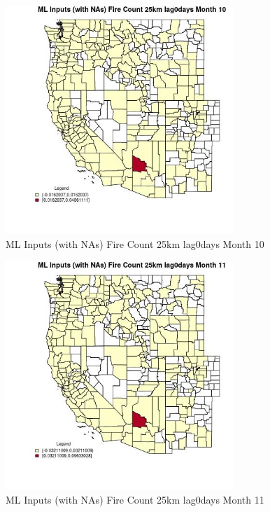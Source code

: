 \begin{figure} 
\centering  
\includegraphics[width=0.77\textwidth]{Code_Outputs/Report_ML_input_PM25_Step4_part_e_de_duplicated_aves_compiled_2019-05-21wNAs_CountyFire_Count_25km_lag0daysmedianMonth10.jpg} 
\caption{\label{fig:Report_ML_input_PM25_Step4_part_e_de_duplicated_aves_compiled_2019-05-21wNAsCountyFire_Count_25km_lag0daysmedianMonth10}ML Inputs (with NAs) Fire Count 25km lag0days Month 10} 
\end{figure} 
 

\clearpage 

\begin{figure} 
\centering  
\includegraphics[width=0.77\textwidth]{Code_Outputs/Report_ML_input_PM25_Step4_part_e_de_duplicated_aves_compiled_2019-05-21wNAs_CountyFire_Count_25km_lag0daysmedianMonth11.jpg} 
\caption{\label{fig:Report_ML_input_PM25_Step4_part_e_de_duplicated_aves_compiled_2019-05-21wNAsCountyFire_Count_25km_lag0daysmedianMonth11}ML Inputs (with NAs) Fire Count 25km lag0days Month 11} 
\end{figure} 
 

